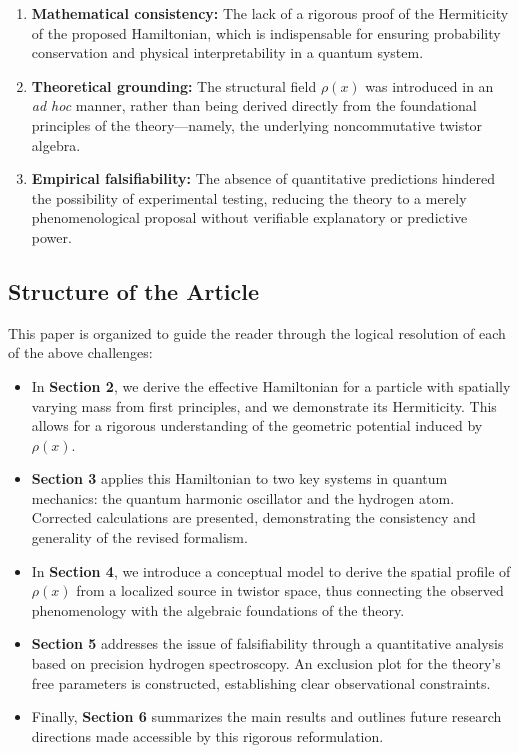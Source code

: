\documentclass[a4paper]{article}
\begin{document}
\begin{enumerate}[label=(\alph*)]
	\item \textbf{Mathematical consistency:} The lack of a rigorous proof of the Hermiticity of the proposed Hamiltonian, which is indispensable for ensuring probability conservation and physical interpretability in a quantum system.
	\item \textbf{Theoretical grounding:} The structural field \( \rho(x) \) was introduced in an \textit{ad hoc} manner, rather than being derived directly from the foundational principles of the theory—namely, the underlying noncommutative twistor algebra.
	\item \textbf{Empirical falsifiability:} The absence of quantitative predictions hindered the possibility of experimental testing, reducing the theory to a merely phenomenological proposal without verifiable explanatory or predictive power.
\end{enumerate}

\subsection{Structure of the Article}

This paper is organized to guide the reader through the logical resolution of each of the above challenges:

\begin{itemize}
	\item In \textbf{Section 2}, we derive the effective Hamiltonian for a particle with spatially varying mass from first principles, and we demonstrate its Hermiticity. This allows for a rigorous understanding of the geometric potential induced by \( \rho(x) \).
	
	\item \textbf{Section 3} applies this Hamiltonian to two key systems in quantum mechanics: the quantum harmonic oscillator and the hydrogen atom. Corrected calculations are presented, demonstrating the consistency and generality of the revised formalism.
	
	\item In \textbf{Section 4}, we introduce a conceptual model to derive the spatial profile of \( \rho(x) \) from a localized source in twistor space, thus connecting the observed phenomenology with the algebraic foundations of the theory.
	
	\item \textbf{Section 5} addresses the issue of falsifiability through a quantitative analysis based on precision hydrogen spectroscopy. An exclusion plot for the theory’s free parameters is constructed, establishing clear observational constraints.
	
	\item Finally, \textbf{Section 6} summarizes the main results and outlines future research directions made accessible by this rigorous reformulation.
\end{itemize}
\end{document}
